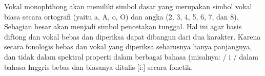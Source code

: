 Vokal monophthong akan memiliki simbol dasar yang merupakan simbol vokal biasa secara ortografi
(yaitu a, A, o, O) dan angka (2, 3, 4, 5, 6, 7, dan 8). Sebagian besar akan menjadi simbol pencetakan tunggal.
Hal ini agar basis diftong dan vokal bebas dan diperiksa dapat dibangun dari dua karakter.
Karena secara fonologis bebas dan vokal yang diperiksa seharusnya hanya panjangnya, dan tidak dalam spektral
properti dalam berbagai bahasa (misalnya: / i / dalam bahasa Inggris bebas dan biasanya ditulis [i:] secara fonetik.
